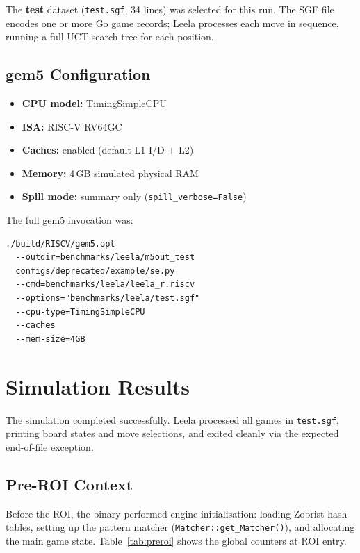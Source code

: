\documentclass[conference]{IEEEtran}
\begin{document}
The \textbf{test} dataset (\texttt{test.sgf}, 34 lines) was selected
for this run. The SGF file encodes one or more Go game records;
Leela processes each move in sequence, running a full UCT search tree
for each position.

\subsection{gem5 Configuration}

\begin{itemize}
    \item \textbf{CPU model:}   TimingSimpleCPU
    \item \textbf{ISA:}         RISC-V RV64GC
    \item \textbf{Caches:}      enabled (default L1 I/D + L2)
    \item \textbf{Memory:}      4\,GB simulated physical RAM
    \item \textbf{Spill mode:}  summary only (\texttt{spill\_verbose=False})
\end{itemize}

The full gem5 invocation was:

\begin{verbatim}
./build/RISCV/gem5.opt
  --outdir=benchmarks/leela/m5out_test
  configs/deprecated/example/se.py
  --cmd=benchmarks/leela/leela_r.riscv
  --options="benchmarks/leela/test.sgf"
  --cpu-type=TimingSimpleCPU
  --caches
  --mem-size=4GB
\end{verbatim}

\section{Simulation Results}

The simulation completed successfully. Leela processed all games in
\texttt{test.sgf}, printing board states and move selections, and
exited cleanly via the expected end-of-file exception.

\subsection{Pre-ROI Context}

Before the ROI, the binary performed engine initialisation: loading
Zobrist hash tables, setting up the pattern matcher
(\texttt{Matcher::get\_Matcher()}), and allocating the main game state.
Table~\ref{tab:preroi} shows the global counters at ROI entry.
\end{document}
